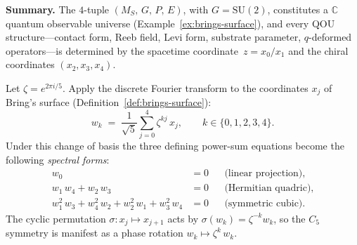 \begin{remark}
\medskip
\noindent\textbf{Summary.}\;
The $4$-tuple $(M_S,\, G,\, P,\, E)$, with $G = \mathrm{SU}(2)$,
constitutes a $\mathbb{C}$ quantum observable universe
(Example~\ref{ex:brings-surface}), and every QOU structure---contact
form, Reeb field, Levi form, substrate parameter, $q$-deformed
operators---is determined by the spacetime coordinate~$z = x_0/x_1$ and
the chiral coordinates $(x_2, x_3, x_4)$.
\end{remark}

\begin{remark}
\label{rem:lagrange-resolvents}
Let $\zeta=e^{2\pi i/5}$.  Apply the discrete Fourier transform to the
coordinates $x_j$ of Bring's surface
(Definition~\ref{def:brings-surface}):
\[
  w_k \;=\; \frac{1}{\sqrt{5}}\sum_{j=0}^{4}\zeta^{kj}\,x_j,
  \qquad k\in\{0,1,2,3,4\}.
\]
Under this change of basis the three defining power-sum equations become the
following \emph{spectral forms}:
\begin{align}
  w_0 &= 0
    &&\text{(linear projection),}
    \label{eq:resolvent-linear}\\[4pt]
  w_1\,w_4+w_2\,w_3 &= 0
    &&\text{(Hermitian quadric),}
    \label{eq:resolvent-quadric}\\[4pt]
  w_1^2\,w_3+w_4^2\,w_2+w_2^2\,w_1+w_3^2\,w_4 &= 0
    &&\text{(symmetric cubic).}
    \label{eq:resolvent-cubic}
\end{align}
The cyclic permutation $\sigma\colon x_j\mapsto x_{j+1}$ acts by
$\sigma(w_k)=\zeta^{-k}w_k$, so the $C_5$ symmetry is manifest as a phase
rotation $w_k\mapsto\zeta^k\,w_k$.
\end{remark}

